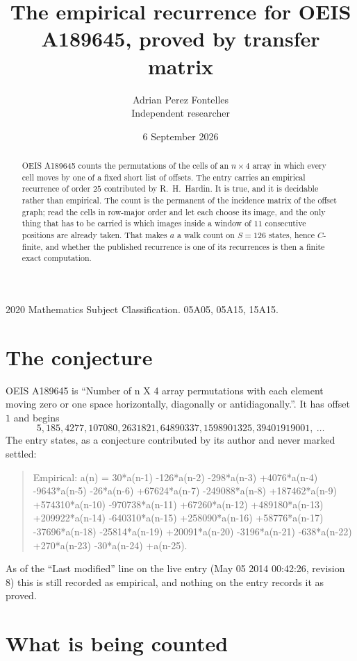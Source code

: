 \documentclass[11pt,a4paper]{article}
\title{The empirical recurrence for OEIS A189645, proved by transfer matrix}
\author{Adrian Perez Fontelles\\ \small Independent researcher}
\date{6 September 2026}
\theoremstyle{plain}
\theoremstyle{definition}
\begin{document}
\maketitle

\begin{abstract}
OEIS A189645 counts the permutations of the cells of an $n\times4$ array in which every cell
moves by one of a fixed short list of offsets. The entry carries an empirical recurrence of
order $25$ contributed by R.~H.~Hardin. It is true, and it is decidable rather than
empirical. The count is the permanent of the incidence matrix of the offset graph; read the
cells in row-major order and let each choose its image, and the only thing that has to be
carried is which images inside a window of $11$ consecutive positions are already taken.
That makes $a$ a walk count on $S=126$ states, hence $C$-finite, and whether the published
recurrence is one of its recurrences is then a finite exact computation.
\end{abstract}

\noindent\small 2020 Mathematics Subject Classification. 05A05, 05A15, 15A15.\normalsize

\section{The conjecture}

OEIS A189645 is ``Number of n X 4 array permutations with each element moving zero or one space horizontally, diagonally or antidiagonally.''. It has offset $1$ and begins
\[
5, 185, 4277, 107080, 2631821, 64890337, 1598901325, 39401919001,\ \dots
\]
The entry states, as a conjecture contributed by its author and never marked settled:
\begin{quote}
Empirical: a(n) = 30*a(n-1) -126*a(n-2) -298*a(n-3) +4076*a(n-4) -9643*a(n-5) -26*a(n-6) +67624*a(n-7) -249088*a(n-8) +187462*a(n-9) +574310*a(n-10) -970738*a(n-11) +67260*a(n-12) +489180*a(n-13) +209922*a(n-14) -640310*a(n-15) +258090*a(n-16) +58776*a(n-17) -37696*a(n-18) -25814*a(n-19) +20091*a(n-20) -3196*a(n-21) -638*a(n-22) +270*a(n-23) -30*a(n-24) +a(n-25).
\end{quote}
As of the ``Last modified'' line on the live entry (May 05 2014 00:42:26, revision 8) this is still
recorded as empirical, and nothing on the entry records it as proved.

\section{What is being counted}
\end{document}
